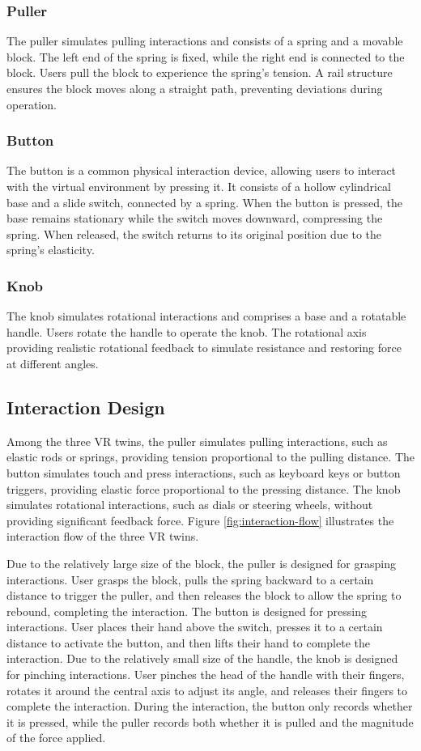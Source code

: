 \documentclass[runningheads]{llncs}
\begin{document}
\subsubsection{Puller}
The puller simulates pulling interactions and consists of a spring and a movable block. The left end of the spring is fixed, while the right end is connected to the block. Users pull the block to experience the spring's tension. A rail structure ensures the block moves along a straight path, preventing deviations during operation.

\subsubsection{Button}
The button is a common physical interaction device, allowing users to interact with the virtual environment by pressing it. It consists of a hollow cylindrical base and a slide switch, connected by a spring. When the button is pressed, the base remains stationary while the switch moves downward, compressing the spring. When released, the switch returns to its original position due to the spring's elasticity.

\subsubsection{Knob}
The knob simulates rotational interactions and comprises a base and a rotatable handle. Users rotate the handle to operate the knob. The rotational axis providing realistic rotational feedback to simulate resistance and restoring force at different angles.

\subsection{Interaction Design}
Among the three VR twins, the puller simulates pulling interactions, such as elastic rods or springs, providing tension proportional to the pulling distance. The button simulates touch and press interactions, such as keyboard keys or button triggers, providing elastic force proportional to the pressing distance. The knob simulates rotational interactions, such as dials or steering wheels, without providing significant feedback force. Figure \ref{fig:interaction-flow} illustrates the interaction flow of the three VR twins.

Due to the relatively large size of the block, the puller is designed for grasping interactions. User grasps the block, pulls the spring backward to a certain distance to trigger the puller, and then releases the block to allow the spring to rebound, completing the interaction. The button is designed for pressing interactions. User places their hand above the switch, presses it to a certain distance to activate the button, and then lifts their hand to complete the interaction. Due to the relatively small size of the handle, the knob is designed for pinching interactions. User pinches the head of the handle with their fingers, rotates it around the central axis to adjust its angle, and releases their fingers to complete the interaction. During the interaction, the button only records whether it is pressed, while the puller records both whether it is pulled and the magnitude of the force applied.
\end{document}

